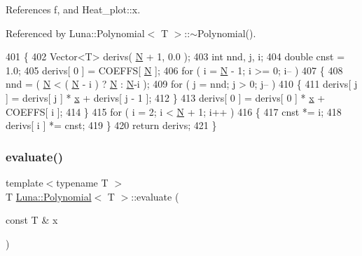 References f, and Heat\+\_\+plot\+::x.



Referenced by Luna\+::\+Polynomial$<$ T $>$\+::$\sim$\+Polynomial().


\begin{DoxyCode}
401     \{
402         Vector<T> derivs( \hyperlink{namespaceHeat__plot_a7d050092798e28458a263710837bda77}{N} + 1, 0.0 );
403         \textcolor{keywordtype}{int} nnd, j, i;
404         \textcolor{keywordtype}{double} cnst = 1.0;
405         derivs[ 0 ] = COEFFS[ \hyperlink{namespaceHeat__plot_a7d050092798e28458a263710837bda77}{N} ];
406         \textcolor{keywordflow}{for} ( i = \hyperlink{namespaceHeat__plot_a7d050092798e28458a263710837bda77}{N} - 1; i >= 0; i-- )
407         \{
408             nnd = ( \hyperlink{namespaceHeat__plot_a7d050092798e28458a263710837bda77}{N} < ( \hyperlink{namespaceHeat__plot_a7d050092798e28458a263710837bda77}{N} - i ) ? \hyperlink{namespaceHeat__plot_a7d050092798e28458a263710837bda77}{N} : \hyperlink{namespaceHeat__plot_a7d050092798e28458a263710837bda77}{N}-i );
409             \textcolor{keywordflow}{for} ( j = nnd; j > 0; j-- )
410             \{
411                  derivs[ j ] = derivs[ j ] * \hyperlink{namespaceHeat__plot_aa88370c16b85b784ccbde3ed88bc1991}{x} + derivs[ j - 1 ];
412             \}
413             derivs[ 0 ] = derivs[ 0 ] * \hyperlink{namespaceHeat__plot_aa88370c16b85b784ccbde3ed88bc1991}{x} + COEFFS[ i ];
414         \}
415         \textcolor{keywordflow}{for} ( i = 2; i < \hyperlink{namespaceHeat__plot_a7d050092798e28458a263710837bda77}{N} + 1; i++ )
416         \{
417             cnst *= i;
418             derivs[ i ] *= cnst;
419         \}
420         \textcolor{keywordflow}{return} derivs;
421     \}
\end{DoxyCode}
\mbox{\label{classLuna_1_1Polynomial_aee740c1957530475bb4a9956f06864e4}} 
\subsubsection{\texorpdfstring{evaluate()}{evaluate()}}
{\footnotesize\ttfamily template$<$typename T $>$ \\
T \hyperlink{classLuna_1_1Polynomial}{Luna\+::\+Polynomial}$<$ T $>$\+::evaluate (\begin{DoxyParamCaption}\item[{const T \&}]{x }\end{DoxyParamCaption})\hspace{0.3cm}{\ttfamily [inline]}}



